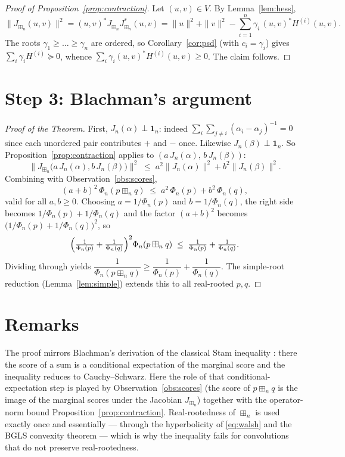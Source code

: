 \documentclass[11pt]{article}
\newcommand{\bn}{\boxplus_n}
\newcommand{\score}{J_n}
\newcommand{\PSD}{\succeq 0}
\theoremstyle{definition}
\begin{document}
\begin{proof}[Proof of Proposition~\ref{prop:contraction}]
Let $(u,v)\in V$. By Lemma~\ref{lem:hess},
\[
\|J_{\bn}(u,v)\|^2=(u,v)^\ast J_{\bn}J_{\bn}^\ast(u,v)
=\|u\|^2+\|v\|^2-\sum_{i=1}^n\gamma_i\,(u,v)^\ast H^{(i)}(u,v).
\]
The roots $\gamma_1\ge\dots\ge\gamma_n$ are ordered, so
Corollary~\ref{cor:psd} (with $c_i=\gamma_i$) gives $\sum_i\gamma_i H^{(i)}\PSD$,
whence $\sum_i\gamma_i(u,v)^\ast H^{(i)}(u,v)\ge0$. The claim follows.
\end{proof}

\section*{Step 3: Blachman's argument}

\begin{proof}[Proof of the Theorem]
First, $\score(\alpha)\perp\mathbf 1_n$: indeed
$\sum_i\sum_{j\ne i}(\alpha_i-\alpha_j)^{-1}=0$ since each unordered pair
contributes $+$ and $-$ once. Likewise $\score(\beta)\perp\mathbf 1_n$. So
Proposition~\ref{prop:contraction} applies to
$(a\,\score(\alpha),\,b\,\score(\beta))$:
\[
\bigl\|J_{\bn}\bigl(a\,\score(\alpha),b\,\score(\beta)\bigr)\bigr\|^2
\;\le\;a^2\|\score(\alpha)\|^2+b^2\|\score(\beta)\|^2 .
\]
Combining with Observation~\ref{obs:scores},
\[
(a+b)^2\,\Phi_n(p\bn q)\;\le\;a^2\,\Phi_n(p)+b^2\,\Phi_n(q),
\]
valid for all $a,b\ge0$. Choosing $a=1/\Phi_n(p)$ and $b=1/\Phi_n(q)$, the right
side becomes $1/\Phi_n(p)+1/\Phi_n(q)$ and the factor $(a+b)^2$ becomes
$\bigl(1/\Phi_n(p)+1/\Phi_n(q)\bigr)^2$, so
\[
\Bigl(\tfrac{1}{\Phi_n(p)}+\tfrac{1}{\Phi_n(q)}\Bigr)^2\Phi_n(p\bn q)
\;\le\;\tfrac{1}{\Phi_n(p)}+\tfrac{1}{\Phi_n(q)} .
\]
Dividing through yields
$\dfrac{1}{\Phi_n(p\bn q)}\ge\dfrac{1}{\Phi_n(p)}+\dfrac{1}{\Phi_n(q)}$.
The simple-root reduction (Lemma~\ref{lem:simple}) extends this to all
real-rooted $p,q$.
\end{proof}

\section*{Remarks}

The proof mirrors Blachman's \cite{Blachman} derivation of the classical Stam
inequality \cite{Stam}: there the score of a sum is a conditional expectation of
the marginal score and the inequality reduces to Cauchy--Schwarz. Here the role
of that conditional-expectation step is played by
Observation~\ref{obs:scores} (the score of $p\bn q$ is the image of the marginal
scores under the Jacobian $J_{\bn}$) together with the operator-norm bound
Proposition~\ref{prop:contraction}. Real-rootedness of $\bn$ is used exactly
once and essentially — through the hyperbolicity of \eqref{eq:walsh} and the
BGLS convexity theorem — which is why the inequality fails for convolutions that
do not preserve real-rootedness.
\end{document}
